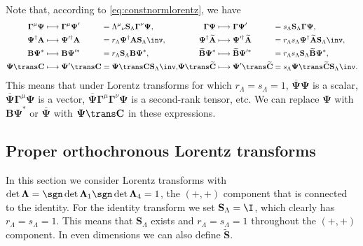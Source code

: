 \documentclass[11pt]{article}
\newcommand{\Gammab}{\boldsymbol{\Gamma}}
\renewcommand{\S}{\mathbf{S}}
\newcommand{\A}{\mathbf{A}}
\newcommand{\B}{\mathbf{B}}
\renewcommand{\C}{\mathbf{C}}
\newcommand{\At}{\widetilde{\A}}
\newcommand{\Bt}{\widetilde{\B}}
\newcommand{\Ct}{\widetilde{\C}}
\newcommand{\St}{\widetilde{\S}}
\newcommand{\Psib}{\boldsymbol{\Psi}}
\newcommand{\Lambdab}{\boldsymbol{\Lambda}}
\begin{document}
Note that, according to \cref{eq:constnormlorentz}, we have
%
\begin{equation}\label{eq:cclorentz}
\begin{alignedat}{4}
  \Gammab^\mu \Psib &\longmapsto \Gammab^\mu \Psib' &
    &= \Lambda^\mu{}_\nu \S_\Lambda \Gammab^\nu \Psib, &
  \Gammab \Psib &\longmapsto \Gammab \Psib' &
    &= s_\Lambda \S_\Lambda \Gammab \Psib, \\ 
  \Psib^\dag \A &\longmapsto \Psib'^\dag \A &
    &= r_\Lambda \Psib^\dag \A \S_\Lambda\inv, & \qquad
  \Psib^\dag \At &\longmapsto \Psib'^\dag \At &
    &= r_\Lambda s_\Lambda \Psib^\dag \At \S_\Lambda\inv, \\ 
  \B \Psib^\ast &\longmapsto \B \Psib'^\ast &
    &= r_\Lambda \S_\Lambda \B \Psib^\ast, & 
  \Bt \Psib^\ast &\longmapsto \Bt \Psib'^\ast &
    &= r_\Lambda s_\Lambda \S_\Lambda \Bt \Psib^\ast, \\ 
  \Psib\trans \C &\longmapsto \Psib'{}\trans \C &
    &= \Psib\trans \C \S_\Lambda\inv, &
  \Psib\trans \Ct &\longmapsto \Psib'{}\trans \Ct &
    &= s_\Lambda \Psib\trans \Ct \S_\Lambda\inv. \\ 
\end{alignedat}
\end{equation}
%
This means that under Lorentz transforms for which \(r_\Lambda = s_\Lambda = 1\), 
\(\overline{\Psib} \Psib\) is a scalar,
\(\overline{\Psib} \Gammab^\mu \Psib\) is a vector,
\(\overline{\Psib} \Gammab^\mu \Gammab^\nu \Psib\) is a second-rank tensor, etc.
We can replace \(\Psib\) with \(\B \Psib^\ast\) or \(\overline{\Psib}\) with \(\Psib\trans \C\) in these expressions. 



\subsection{Proper orthochronous Lorentz transforms}\label{sec:properlorentz}

In this section we consider Lorentz transforms with \(\det \Lambdab = \sgn \det \Lambdab_1 \sgn \det \Lambdab_4 = 1\), \ie the \((+,+)\) component that is connected to the identity.
For the identity transform we set \(\S_\Lambda = \I\), which clearly has \(r_\Lambda = s_\Lambda = 1\).
This means that \(\S_\Lambda\) exists and \(r_\Lambda = s_\Lambda = 1\) throughout the \((+,+)\) component.
In even dimensions we can also define \(\St\).
\end{document}
